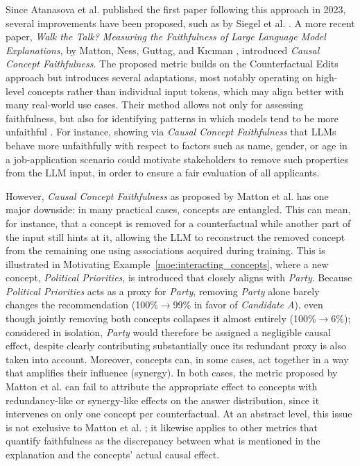 Since Atanasova et al. \cite{atanasovaFaithfulnessTestsNatural2023} published the first paper following this approach in 2023, several improvements have been proposed, such as by Siegel et al. \cite{siegelProbabilitiesAlsoMatter2024}. A more recent paper, \emph{Walk the Talk? Measuring the Faithfulness of Large Language Model Explanations}, by Matton, Ness, Guttag, and Kıcıman \cite{mattonWalkTalkMeasuring2024}, introduced \emph{Causal Concept Faithfulness}. The proposed metric builds on the Counterfactual Edits approach but introduces several adaptations, most notably operating on high-level concepts rather than individual input tokens, which may align better with many real-world use cases. Their method allows not only for assessing faithfulness, but also for identifying patterns in which models tend to be more unfaithful \cite{mattonWalkTalkMeasuring2024}. For instance, showing via \emph{Causal Concept Faithfulness} that LLMs behave more unfaithfully with respect to factors such as name, gender, or age in a job-application scenario could motivate stakeholders to remove such properties from the LLM input, in order to ensure a fair evaluation of all applicants.

However, \emph{Causal Concept Faithfulness} as proposed by Matton et al. \cite{mattonWalkTalkMeasuring2024} has one major downside: in many practical cases, concepts are entangled. This can mean, for instance, that a concept is removed for a counterfactual while another part of the input still hints at it, allowing the LLM to reconstruct the removed concept from the remaining one using associations acquired during training. This is illustrated in Motivating Example~\ref{moe:interacting_concepts}, where a new concept, \emph{Political Priorities}, is introduced that closely aligns with \emph{Party}. Because \emph{Political Priorities} acts as a proxy for \emph{Party}, removing \emph{Party} alone barely changes the recommendation (100\%$\rightarrow$99\% in favor of \emph{Candidate A}), even though jointly removing both concepts collapses it almost entirely (100\%$\rightarrow$6\%); considered in isolation, \emph{Party} would therefore be assigned a negligible causal effect, despite clearly contributing substantially once its redundant proxy is also taken into account. Moreover, concepts can, in some cases, act together in a way that amplifies their influence (synergy). In both cases, the metric proposed by Matton et al. \cite{mattonWalkTalkMeasuring2024} can fail to attribute the appropriate effect to concepts with redundancy-like or synergy-like effects on the answer distribution, since it intervenes on only one concept per counterfactual. At an abstract level, this issue is not exclusive to Matton et al. \cite{mattonWalkTalkMeasuring2024}; it likewise applies to other metrics that quantify faithfulness as the discrepancy between what is mentioned in the explanation and the concepts' actual causal effect.
\newline
\noindent


